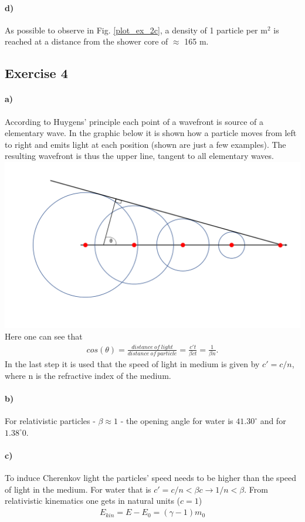 \documentclass{article}
\begin{document}
\paragraph{d)}
As possible to observe in Fig. \ref{plot_ex_2c}, a density of 1 particle per m$^2$ is reached at a distance from the shower core of $\approx$ 165 m.

\subsection*{Exercise 4}
\paragraph{a)}
According to Huygens' principle each point of a wavefront is source of a elementary wave. 
In the graphic below it is shown how a particle moves from left to right and emits light at each position (shown are just a few examples). 
The resulting wavefront is thus the upper line, tangent to all elementary waves. \\
\includegraphics[width=\textwidth]{exercise4.png}\\
Here one can see that 
\begin{align*}
cos(\theta) = \frac{distance\ of\ light}{distance\ of\ particle} = \frac{c't}{\beta c t} = \frac{1}{\beta n}.
\end{align*}
In the last step it is used that the speed of light in medium is given by $c' = c / n$, where n is the refractive index of the medium.

\paragraph{b)}
For relativistic particles - $\beta \approx 1$ - the opening angle for water is $41.30^\circ$ and for $1.38^\circ0$.

\paragraph{c)}
To induce Cherenkov light the particles' speed needs to be higher than the speed of light in the medium. For water that is $c' = c/n < \beta c \rightarrow 1/n < \beta$.
From relativistic kinematics one gets in natural units ($c=1$)
\begin{align*}
E_{kin} = E - E_0 = (\gamma - 1) m_0
\end{align*}
\end{document}
